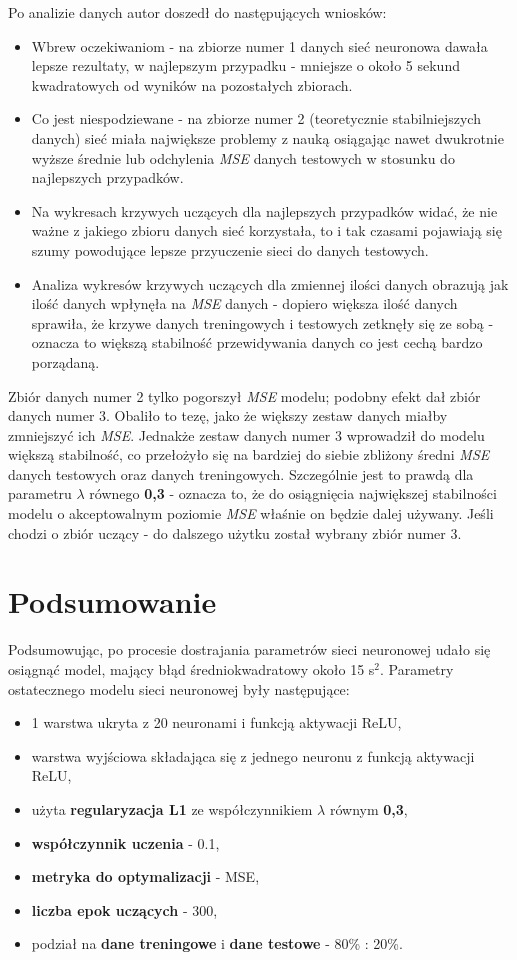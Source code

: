 \documentclass[12pt]{aghdpl}
\begin{document}
		Po analizie danych autor doszedł do następujących wniosków:
		\begin{itemize}
		\item Wbrew oczekiwaniom - na zbiorze numer 1 danych sieć neuronowa dawała lepsze rezultaty, w najlepszym przypadku - mniejsze o około 5 sekund kwadratowych od wyników na pozostałych zbiorach.
		\item Co jest niespodziewane - na zbiorze numer 2 (teoretycznie stabilniejszych danych) sieć miała największe problemy z nauką osiągając nawet dwukrotnie wyższe średnie lub odchylenia \textit{MSE} danych testowych w stosunku do najlepszych przypadków.
		\item Na wykresach krzywych uczących dla najlepszych przypadków widać, że nie ważne z jakiego zbioru danych sieć korzystała, to i tak czasami pojawiają się szumy powodujące lepsze przyuczenie sieci do danych testowych.
		\item Analiza wykresów krzywych uczących dla zmiennej ilości danych obrazują jak ilość danych wpłynęła na \textit{MSE} danych - dopiero większa ilość danych sprawiła, że krzywe danych treningowych i testowych zetknęły się ze sobą - oznacza to większą stabilność przewidywania danych co jest cechą bardzo porządaną.
		\end{itemize}	
		
		Zbiór danych numer 2 tylko pogorszył \textit{MSE} modelu; podobny efekt dał zbiór danych numer 3. Obaliło to tezę, jako że większy zestaw danych miałby zmniejszyć ich \textit{MSE}. Jednakże zestaw danych numer 3 wprowadził do modelu większą stabilność, co przełożyło się na bardziej do siebie zbliżony średni \textit{MSE} danych testowych oraz danych treningowych. Szczególnie jest to prawdą dla parametru $\lambda$ równego \textbf{0,3} - oznacza to, że do osiągnięcia największej stabilności modelu o akceptowalnym poziomie \textit{MSE} właśnie on będzie dalej używany. Jeśli chodzi o zbiór uczący - do dalszego użytku został wybrany zbiór numer 3.
		
		\section{Podsumowanie}	
		Podsumowując, po procesie dostrajania parametrów sieci neuronowej udało się osiągnąć model, mający błąd średniokwadratowy około 15 s$^2$. Parametry ostatecznego modelu sieci neuronowej były następujące:
		\begin{itemize}
		\item 1 warstwa ukryta z 20 neuronami i funkcją aktywacji ReLU,
		\item warstwa wyjściowa składająca się z jednego neuronu z funkcją aktywacji ReLU,
		\item użyta \textbf{regularyzacja L1} ze współczynnikiem $\lambda$ równym \textbf{0,3},
		\item \textbf{współczynnik uczenia} - 0.1,
		\item \textbf{metryka do optymalizacji} - MSE,
		\item \textbf{liczba epok uczących} - 300,
		\item podział na \textbf{dane treningowe} i \textbf{dane testowe} - 80\% : 20\%.
		\end{itemize}
		
\end{document}
